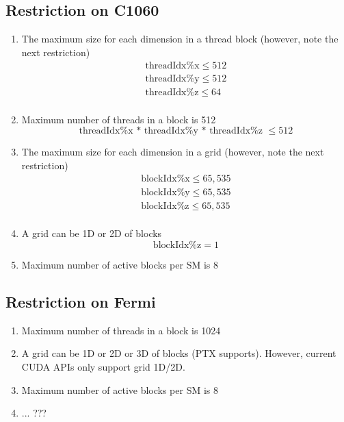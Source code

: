 \subsection{Restriction on C1060}
\label{sec:restriction-c1060}

\begin{enumerate}
\item The maximum size for each dimension in a thread block (however,
  note the next restriction)
  \begin{equation}
    \label{eq:5}
    \begin{split}
      \text{threadIdx\%x} \le 512 \\
      \text{threadIdx\%y} \le 512 \\
      \text{threadIdx\%z} \le 64 \\
    \end{split}
  \end{equation}
\item Maximum number of threads in a block is 512
  \begin{equation}
    \label{eq:3}
    \text{threadIdx\%x * threadIdx\%y * threadIdx\%z } \le 512
  \end{equation}
\item The maximum size for each dimension in a grid (however, note the
  next restriction)
  \begin{equation}
    \label{eq:6}
    \begin{split}
      \text{blockIdx\%x} \le 65,535 \\
      \text{blockIdx\%y} \le 65,535 \\
      \text{blockIdx\%z} \le 65,535 \\
    \end{split}
  \end{equation}
\item A grid can be 1D or 2D of blocks
  \begin{equation}
    \label{eq:4}
    \text{blockIdx\%z} = 1
  \end{equation}
\item Maximum number of active blocks per SM is 8
\end{enumerate}

\subsection{Restriction on Fermi}
\label{sec:restriction-fermi}

\begin{enumerate}
\item Maximum number of threads in a block is 1024

\item A grid can be 1D or 2D or 3D of blocks (PTX supports). However,
  current CUDA APIs only support grid 1D/2D.

\item Maximum number of active blocks per SM is 8
\item ... ???
\end{enumerate}

